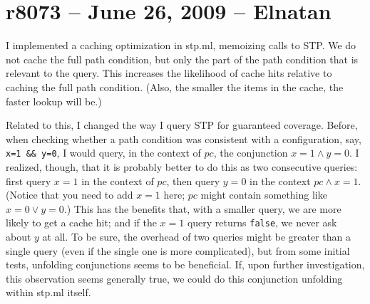 \documentclass{amsbook}
\begin{document}
\section*{r8073 -- June 26, 2009 -- Elnatan}
I implemented a caching optimization in stp.ml, memoizing calls to
STP. We do not cache the full path condition, but only the part of the
path condition that is relevant to the query. This increases the
likelihood of cache hits relative to caching the full path
condition. (Also, the smaller the items in the cache, the faster
lookup will be.)

Related to this, I changed the way I query STP for guaranteed
coverage. Before, when checking whether a path condition was
consistent with a configuration, say, \texttt{x=1 \&\& y=0}, I would
query, in the context of $pc$, the conjunction $x=1 \wedge y=0$. I
realized, though, that it is probably better to do this as two
consecutive queries: first query $x=1$ in the context of $pc$, then
query $y=0$ in the context $pc \wedge x=1$. (Notice that you need to
add $x=1$ here; $pc$ might contain something like $x=0 \vee y=0$.)
This has the benefits that, with a smaller query, we are more likely
to get a cache hit; and if the $x=1$ query returns \texttt{false}, we
never ask about $y$ at all. To be sure, the overhead of two queries
might be greater than a single query (even if the single one is more
complicated), but from some initial tests, unfolding conjunctions
seems to be beneficial. If, upon further investigation, this
observation seems generally true, we could do this conjunction
unfolding within stp.ml itself.
\end{document}
